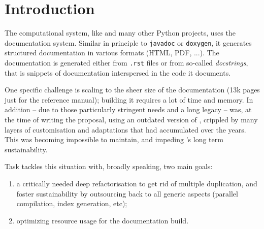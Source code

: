 \documentclass{deliverablereport}
\author{Jeroen Demeyer}
\begin{document}
\maketitle
\tableofcontents


\section{Introduction}

The \Sage computational system, like \Python and many other Python
projects, uses the \Sphinx documentation system. Similar in principle
to \lstinline{javadoc} or \lstinline{doxygen}, it generates structured
documentation in various formats (HTML, PDF, ...).
The documentation is generated either from \texttt{.rst} files
or from so-called \emph{docstrings}, that is snippets of documentation
interspersed in the code it documents.

One specific challenge is scaling to the sheer size of the \Sage
documentation (13k pages just for the reference manual); building it
requires a lot of time and memory. In addition -- due to those particularly
stringent needs and a long legacy -- \Sage was, at the time of writing
the proposal, using an outdated version of \Sphinx, crippled by many
layers of customisation and adaptations that had accumulated over the
years. This was becoming impossible to maintain, and impeding
\Sage's long term sustainability.

Task  tackles this situation with, broadly
speaking, two main goals:
\begin{enumerate}
\item a critically needed deep refactorisation to get rid of multiple
  duplication, and foster sustainability by outsourcing back to
  \Sphinx all generic aspects (parallel compilation, index generation,
  etc);
\item optimizing resource usage for the documentation build.
\end{enumerate}
\end{document}
